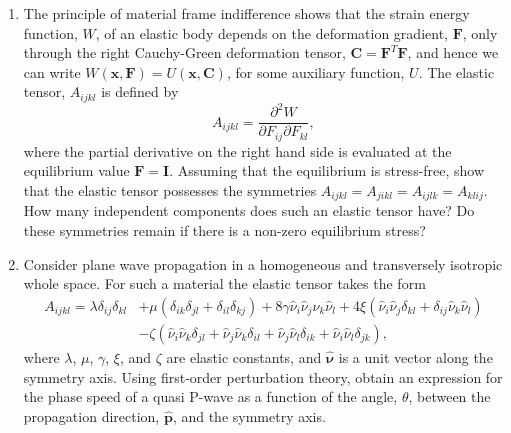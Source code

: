 \documentclass[a4paper,10pt]{paper}
\begin{document}
\begin{enumerate}
The energy density for this system is defined by
\begin{equation*}
    E=\frac{1}{2}\rho\frac{\partial u_{i}}{\partial t}\frac{\partial u_{i}}{\partial t}+\frac{1}{2}A_{ijkl}\frac{\partial u_{i}}{\partial x_{j}}\frac{\partial u_{k}}{\partial x_{l}}.
\end{equation*}
In the absence of a stress glut, show the following equality holds
\begin{equation*}
    \frac{\partial E}{\partial t}+\frac{\partial s_{i}}{\partial x_{i}}=0.
\end{equation*}
Here $s_{i}$ is known as the elastic Poynting vector; the form and physical significance of this vector should be determined as part of your solution.

\item The principle of material frame indifference shows that the strain energy function, $W$, of an elastic body depends on the deformation gradient, $\mathbf{F}$, only through the right Cauchy-Green deformation tensor, $\mathbf{C}=\mathbf{F}^{T}\mathbf{F}$, and hence we can write $W(\mathbf{x},\mathbf{F})=U(\mathbf{x},\mathbf{C})$, for some auxiliary function, $U$. The elastic tensor, $A_{ijkl}$ is defined by
\begin{equation*}
    A_{ijkl}=\frac{\partial^{2}W}{\partial F_{ij}\partial F_{kl}},
\end{equation*}
where the partial derivative on the right hand side is evaluated at the equilibrium value $\mathbf{F}=\mathbf{I}$. Assuming that the equilibrium is stress-free, show that the elastic tensor possesses the symmetries $A_{ijkl}=A_{jikl}=A_{ijlk}=A_{klij}$.
How many independent components does such an elastic tensor have? Do these symmetries remain if there is a non-zero equilibrium stress?

\item Consider plane wave propagation in a homogeneous and transversely isotropic whole space. For such a material the elastic tensor takes the form
\begin{align*}
A_{ijkl} = \lambda\delta_{ij}\delta_{kl} &+ \mu(\delta_{ik}\delta_{jl}+\delta_{il}\delta_{kj})+8\gamma\hat{\nu}_{i}\hat{\nu}_{j}\hat{\nu}_{k}\hat{\nu}_{l}+4\xi(\hat{\nu}_{i}\hat{\nu}_{j}\delta_{kl}+\delta_{ij}\hat{\nu}_{k}\hat{\nu}_{l}) \\
&-\zeta(\hat{\nu}_{i}\hat{\nu}_{k}\delta_{jl}+\hat{\nu}_{j}\hat{\nu}_{k}\delta_{il}+\hat{\nu}_{j}\hat{\nu}_{l}\delta_{ik}+\hat{\nu}_{i}\hat{\nu}_{l}\delta_{jk}),
\end{align*}
where $\lambda$, $\mu$, $\gamma$, $\xi$, and $\zeta$ are elastic constants, and $\hat{\boldsymbol{\nu}}$ is a unit vector along the symmetry axis. Using first-order perturbation theory, obtain an expression for the phase speed of a quasi P-wave as a function of the angle, $\theta$, between the propagation direction, $\hat{\mathbf{p}}$, and the symmetry axis.


\end{enumerate}
\end{document}
